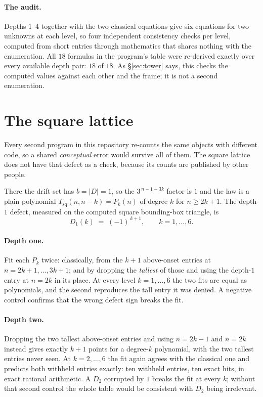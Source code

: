 \documentclass[11pt]{article}
\begin{document}
\paragraph{The audit.} Depths $1$--$4$ together with the two classical
equations give six equations for two unknowns at each level, so four
independent consistency checks per level, computed from short entries through
mathematics that shares nothing with the enumeration. All $18$ formulas in the
program's table were re-derived exactly over every available depth pair: $18$
of $18$. As \S\ref{sec:tower} says, this checks the computed values against
each other and the frame; it is not a second enumeration.

\section{The square lattice}
\label{sec:square}

Every second program in this repository re-counts the same objects with
different code, so a shared \emph{conceptual} error would survive all of them.
The square lattice does not have that defect as a check, because its counts
are published by other people.

There the drift set has $b = |D| = 1$, so the $3^{\,n-1-3k}$ factor is $1$ and
the law is a plain polynomial $T_{\mathrm{sq}}(n, n-k) = P_k(n)$ of degree $k$
for $n \ge 2k+1$. The depth-$1$ defect, measured on the computed square
bounding-box triangle, is
\[
  D_1(k) \;=\; (-1)^{\,k+1},
  \qquad k = 1,\dots,6 .
\]

\paragraph{Depth one.} Fit each $P_k$ twice: classically, from the $k+1$
above-onset entries at $n = 2k+1, \dots, 3k+1$; and by dropping the
\emph{tallest} of those and using the depth-$1$ entry at $n = 2k$ in its place.
At every level $k = 1,\dots,6$ the two fits are equal as polynomials, and the
second reproduces the tall entry it was denied. A negative control confirms
that the wrong defect sign breaks the fit.

\paragraph{Depth two.} Dropping the two tallest above-onset entries and using
$n = 2k-1$ and $n = 2k$ instead gives exactly $k+1$ points for a degree-$k$
polynomial, with the two tallest entries never seen. At $k = 2,\dots,6$ the
fit again agrees with the classical one and predicts both withheld entries
exactly: ten withheld entries, ten exact hits, in exact rational arithmetic. A
$D_2$ corrupted by $1$ breaks the fit at every $k$; without that second
control the whole table would be consistent with $D_2$ being irrelevant.
\end{document}
